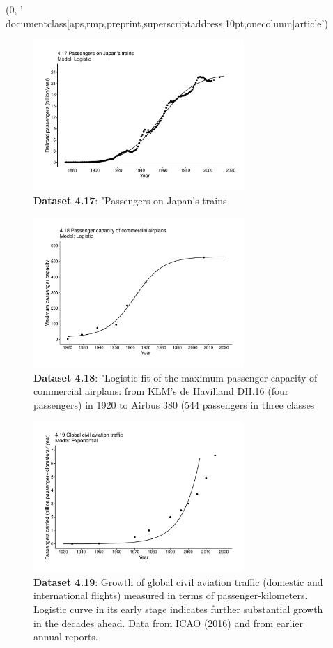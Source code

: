 (0, '\\documentclass[aps,rmp,preprint,superscriptaddress,10pt,onecolumn]{article}\n')
\begin{document}
\begin{figure}[h]
\includegraphics[width=8cm]{output/figs-ggplot/4.17.pdf}
\caption{\textbf{Dataset 4.17}: "Passengers on Japan's trains}
\end{figure}
	
\begin{figure}[h]
\includegraphics[width=8cm]{output/figs-ggplot/4.18.pdf}
\caption{\textbf{Dataset 4.18}: "Logistic fit of the maximum passenger capacity of commercial airplans: from KLM's de Havilland DH.16 (four passengers) in 1920 to Airbus 380 (544 passengers in three classes}
\end{figure}
	
\begin{figure}[h]
\includegraphics[width=8cm]{output/figs-ggplot/4.19.pdf}
\caption{\textbf{Dataset 4.19}: Growth of global civil aviation traffic (domestic and international flights) measured in terms of passenger-kilometers. Logistic curve in its early stage indicates further substantial growth in the decades ahead. Data from ICAO (2016) and from earlier annual reports. }
\end{figure}
	
\end{document}
